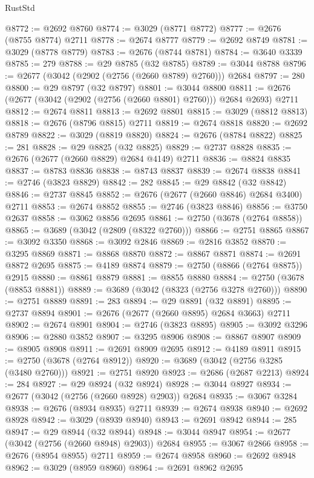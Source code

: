 \begin{lexlean}{RustStd}
\begin{coremodule}
@8772 := @2692 @8760
@8774 := @3029 (@8771 @8772)
@8777 := @2676 (@8755 @8774) @2711
@8778 := @2674 @8777
@8779 := @2692 @8749
@8781 := @3029 (@8778 @8779)
@8783 := @2676 (@8744 @8781)
@8784 := @3640 @3339
@8785 := 279
@8788 := @29 @8785 (@32 @8785)
@8789 := @3044 @8788
@8796 := @2677 (@3042 (@2902 (@2756 (@2660 @8789) @2760))) @2684
@8797 := 280
@8800 := @29 @8797 (@32 @8797)
@8801 := @3044 @8800
@8811 := @2676 (@2677 (@3042 (@2902 (@2756 (@2660 @8801) @2760))) @2684 @2693) @2711
@8812 := @2674 @8811
@8813 := @2692 @8801
@8815 := @3029 (@8812 @8813)
@8818 := @2676 (@8796 @8815) @2711
@8819 := @2674 @8818
@8820 := @2692 @8789
@8822 := @3029 (@8819 @8820)
@8824 := @2676 (@8784 @8822)
@8825 := 281
@8828 := @29 @8825 (@32 @8825)
@8829 := @2737 @8828
@8835 := @2676 (@2677 (@2660 @8829) @2684 @4149) @2711
@8836 := @8824 @8835
@8837 := @8783 @8836
@8838 := @8743 @8837
@8839 := @2674 @8838
@8841 := @2746 (@3823 @8829)
@8842 := 282
@8845 := @29 @8842 (@32 @8842)
@8846 := @2737 @8845
@8852 := @2676 (@2677 (@2660 @8846) @2684 @3400) @2711
@8853 := @2674 @8852
@8855 := @2746 (@3823 @8846)
@8856 := @3750 @2637
@8858 := @3062 @8856 @2695
@8861 := @2750 (@3678 (@2764 @8858))
@8865 := @3689 (@3042 (@2809 (@8322 @2760)))
@8866 := @2751 @8865
@8867 := @3092 @3350
@8868 := @3092 @2846
@8869 := @2816 @3852
@8870 := @3295 @8869
@8871 := @8868 @8870
@8872 := @8867 @8871
@8874 := @2691 @8872 @2695
@8875 := @4189 @8874
@8879 := @2750 (@8866 (@2764 @8875)) @2915
@8880 := @8861 @8879
@8881 := @8855 @8880
@8884 := @2750 (@3678 (@8853 @8881))
@8889 := @3689 (@3042 (@8323 (@2756 @3278 @2760)))
@8890 := @2751 @8889
@8891 := 283
@8894 := @29 @8891 (@32 @8891)
@8895 := @2737 @8894
@8901 := @2676 (@2677 (@2660 @8895) @2684 @3663) @2711
@8902 := @2674 @8901
@8904 := @2746 (@3823 @8895)
@8905 := @3092 @3296
@8906 := @2880 @3852
@8907 := @3295 @8906
@8908 := @8867 @8907
@8909 := @8905 @8908
@8911 := @2691 @8909 @2695
@8912 := @4189 @8911
@8915 := @2750 (@3678 (@2764 @8912))
@8920 := @3689 (@3042 (@2756 @3285 (@3480 @2760)))
@8921 := @2751 @8920
@8923 := @2686 (@2687 @2213)
@8924 := 284
@8927 := @29 @8924 (@32 @8924)
@8928 := @3044 @8927
@8934 := @2677 (@3042 (@2756 (@2660 @8928) @2903)) @2684
@8935 := @3067 @3284
@8938 := @2676 (@8934 @8935) @2711
@8939 := @2674 @8938
@8940 := @2692 @8928
@8942 := @3029 (@8939 @8940)
@8943 := @2691 @8942
@8944 := 285
@8947 := @29 @8944 (@32 @8944)
@8948 := @3044 @8947
@8954 := @2677 (@3042 (@2756 (@2660 @8948) @2903)) @2684
@8955 := @3067 @2866
@8958 := @2676 (@8954 @8955) @2711
@8959 := @2674 @8958
@8960 := @2692 @8948
@8962 := @3029 (@8959 @8960)
@8964 := @2691 @8962 @2695

\end{coremodule}
\end{lexlean}
